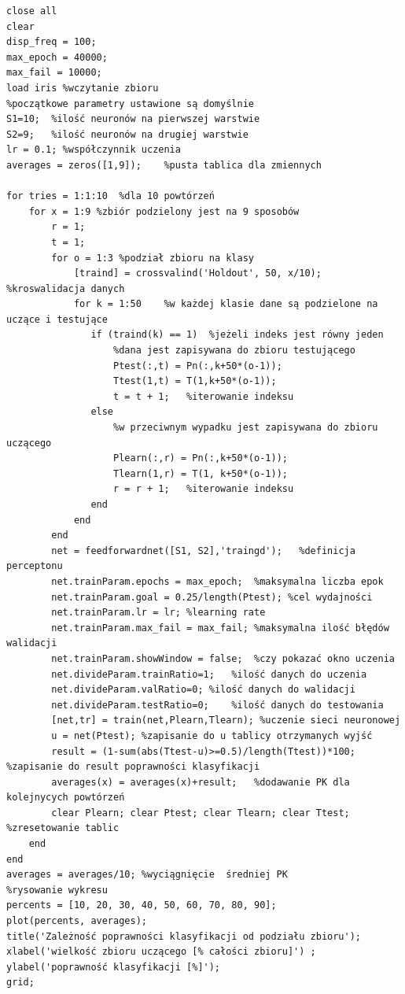 \documentclass[a4paper, 12pt]{report}
\begin{document}
\newpage
\begin{lstlisting}[frame=single]
%wyczyszczenia środowiska i ustawienie wartości początkowych
close all
clear
disp_freq = 100;
max_epoch = 40000;
max_fail = 10000;
load iris %wczytanie zbioru
%początkowe parametry ustawione są domyślnie
S1=10;  %ilość neuronów na pierwszej warstwie
S2=9;   %ilość neuronów na drugiej warstwie
lr = 0.1; %współczynnik uczenia
averages = zeros([1,9]);    %pusta tablica dla zmiennych

for tries = 1:1:10  %dla 10 powtórzeń
    for x = 1:9 %zbiór podzielony jest na 9 sposobów
        r = 1;
        t = 1;
        for o = 1:3 %podział zbioru na klasy
            [traind] = crossvalind('Holdout', 50, x/10);    %kroswalidacja danych
            for k = 1:50    %w każdej klasie dane są podzielone na uczące i testujące
               if (traind(k) == 1)  %jeżeli indeks jest równy jeden
                   %dana jest zapisywana do zbioru testującego
                   Ptest(:,t) = Pn(:,k+50*(o-1));
                   Ttest(1,t) = T(1,k+50*(o-1));
                   t = t + 1;   %iterowanie indeksu
               else
                   %w przeciwnym wypadku jest zapisywana do zbioru uczącego
                   Plearn(:,r) = Pn(:,k+50*(o-1));
                   Tlearn(1,r) = T(1, k+50*(o-1));
                   r = r + 1;   %iterowanie indeksu
               end
            end
        end
        net = feedforwardnet([S1, S2],'traingd');   %definicja perceptonu
        net.trainParam.epochs = max_epoch;  %maksymalna liczba epok
        net.trainParam.goal = 0.25/length(Ptest); %cel wydajności
        net.trainParam.lr = lr; %learning rate
        net.trainParam.max_fail = max_fail; %maksymalna ilość błędów walidacji
        net.trainParam.showWindow = false;  %czy pokazać okno uczenia
        net.divideParam.trainRatio=1;   %ilość danych do uczenia
        net.divideParam.valRatio=0; %ilość danych do walidacji
        net.divideParam.testRatio=0;    %ilość danych do testowania
        [net,tr] = train(net,Plearn,Tlearn); %uczenie sieci neuronowej
        u = net(Ptest); %zapisanie do u tablicy otrzymanych wyjść
        result = (1-sum(abs(Ttest-u)>=0.5)/length(Ttest))*100;  %zapisanie do result poprawności klasyfikacji
        averages(x) = averages(x)+result;   %dodawanie PK dla kolejnycych powtórzeń
        clear Plearn; clear Ptest; clear Tlearn; clear Ttest; %zresetowanie tablic
    end
end
averages = averages/10; %wyciągnięcie  średniej PK
%rysowanie wykresu
percents = [10, 20, 30, 40, 50, 60, 70, 80, 90];
plot(percents, averages);
title('Zależność poprawności klasyfikacji od podziału zbioru');
xlabel('wielkość zbioru uczącego [% całości zbioru]') ;
ylabel('poprawność klasyfikacji [%]');
grid;
\end{lstlisting}
\end{document}
